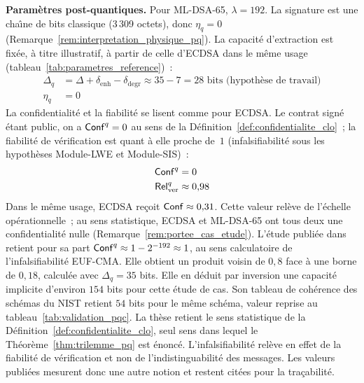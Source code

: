 \begin{sloppypar}
\noindent\textbf{Param\`etres post-quantiques.} Pour ML-DSA-65,
$\lambda = 192$. La signature est une cha\^{\i}ne de bits classique (3\,309 octets),
donc $\eta_q = 0$ (Remarque~\ref{rem:interpretation_physique_pq}). La capacit\'e d'extraction
est fix\'ee, \`a titre illustratif, \`a partir de celle d'ECDSA dans le m\^eme usage
(tableau~\ref{tab:parametres_reference})~:
\begin{align}
\Delta_q &= \Delta + \delta_{\text{enh}} - \delta_{\text{degr}}
\approx 35 - 7 = 28 \text{ bits (hypoth\`ese de travail)}
\label{eq:delta_q_dilithium}\\
\eta_q &= 0
\label{eq:eta_q_dilithium}
\end{align}
La confidentialit\'e et la fiabilit\'e se lisent comme pour ECDSA. Le contrat
sign\'e \'etant public, on a $\mathsf{Conf}^q = 0$ au sens de la
D\'efinition~\ref{def:confidentialite_clo}~; la fiabilit\'e de v\'erification est
quant \`a elle proche de~$1$ (infalsifiabilit\'e sous les hypoth\`eses Module-LWE et Module-SIS)~:
\begin{align}
\mathsf{Conf}^q &= 0
\label{eq:conf_q_dilithium}\\
\mathsf{Rel}_{\mathrm{ver}}^q &\approx 0{,}98
\label{eq:rel_q_dilithium}
\end{align}
Dans le m\^eme usage, ECDSA re\c{c}oit $\mathsf{Conf} \approx 0{,}31$. Cette
valeur rel\`eve de l'\'echelle op\'erationnelle~; au sens statistique, ECDSA et ML-DSA-65
ont tous deux une confidentialit\'e nulle (Remarque~\ref{rem:portee_cas_etude}).
L'\'etude publi\'ee dans~\cite{MINKA2026PQCRO} retient pour sa part
$\mathsf{Conf}^q \approx 1 - 2^{-192} \approx 1$, au sens calculatoire de l'infalsifiabilit\'e
EUF-CMA. Elle obtient un produit voisin de $0{,}8$ face \`a une borne de $0{,}18$, calcul\'ee avec
$\Delta_q = 35$ bits. Elle en d\'eduit par inversion une capacit\'e implicite d'environ $154$ bits pour cette \'etude de cas.
Son tableau de coh\'erence des sch\'emas du NIST retient $54$ bits pour le m\^eme sch\'ema, valeur
reprise au tableau~\ref{tab:validation_pqc}.
La th\`ese retient le sens statistique de la D\'efinition~\ref{def:confidentialite_clo}, seul sens
dans lequel le Th\'eor\`eme~\ref{thm:trilemme_pq} est \'enonc\'e. L'infalsifiabilit\'e rel\`eve en
effet de la fiabilit\'e de v\'erification et non de l'indistinguabilit\'e des messages. Les valeurs
publi\'ees mesurent donc une autre notion et restent cit\'ees pour la tra\c{c}abilit\'e.


\end{sloppypar}
